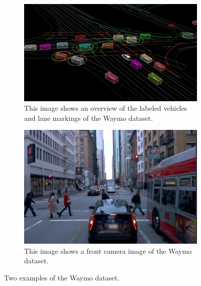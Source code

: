\begin{figure}[h]
	\centering
	\begin{subfigure}[t]{0.4\linewidth}
		\includegraphics[width=\linewidth]{Figures/Datasets/Waymo_Dataset}
		\caption{This image shows an overview of the labeled vehicles and lane markings of the Waymo \cite{sun2020scalability} dataset.}
		\label{fig:dat_waymo_1}
	\end{subfigure} \hspace{0.1\textwidth}
	\begin{subfigure}[t]{0.4\linewidth}
		\includegraphics[width=\linewidth]{Figures/Datasets/Waymo_Dataset2}
		\caption{This image shows a front camera image of the Waymo \cite{sun2020scalability} dataset.}
		\label{fig:dat_waymo_2}
	\end{subfigure}
	\caption{Two examples of the Waymo \cite{sun2020scalability} dataset.}
	\label{fig:dat_waymo_both}
\end{figure}

